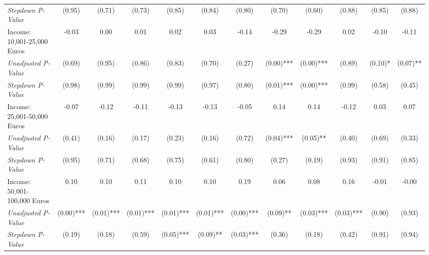 \begin{tabular}{l c c c c c c c c c c c}
\quad \textit{Stepdown P-Value} & (0.95) & (0.71) & (0.73) & (0.85) & (0.84) & (0.80) & (0.70) & (0.60) & (0.88) & (0.85) & (0.88) \\
Income: 10,001-25,000 Euros & -0.03 & 0.00 & 0.01 & 0.02 & 0.03 & -0.14 & -0.29 & -0.29 & 0.02 & -0.10 & -0.11 \\
\quad \textit{Unadjusted P-Value} & (0.69) & (0.95) & (0.86) & (0.83) & (0.70) & (0.27) & (0.00)*** & (0.00)*** & (0.89) & (0.10)* & (0.07)** \\
\quad \textit{Stepdown P-Value} & (0.98) & (0.99) & (0.99) & (0.99) & (0.97) & (0.80) & (0.01)*** & (0.00)*** & (0.99) & (0.58) & (0.45) \\
Income: 25,001-50,000 Euros & -0.07 & -0.12 & -0.11 & -0.13 & -0.13 & -0.05 & 0.14 & 0.14 & -0.12 & 0.03 & 0.07 \\
\quad \textit{Unadjusted P-Value} & (0.41) & (0.16) & (0.17) & (0.23) & (0.16) & (0.72) & (0.04)*** & (0.05)** & (0.40) & (0.69) & (0.33) \\
\quad \textit{Stepdown P-Value} & (0.95) & (0.71) & (0.68) & (0.75) & (0.61) & (0.80) & (0.27) & (0.19) & (0.93) & (0.91) & (0.85) \\
Income: 50,001-100,000 Euros & 0.10 & 0.10 & 0.11 & 0.10 & 0.10 & 0.19 & 0.06 & 0.08 & 0.16 & -0.01 & -0.00 \\
\quad \textit{Unadjusted P-Value} & (0.00)*** & (0.01)*** & (0.01)*** & (0.01)*** & (0.01)*** & (0.00)*** & (0.09)** & (0.03)*** & (0.03)*** & (0.90) & (0.93) \\
\quad \textit{Stepdown P-Value} & (0.19) & (0.18) & (0.59) & (0.05)*** & (0.09)** & (0.03)*** & (0.36) & (0.18) & (0.42) & (0.91) & (0.94) \\
\bottomrule
\end{tabular}
